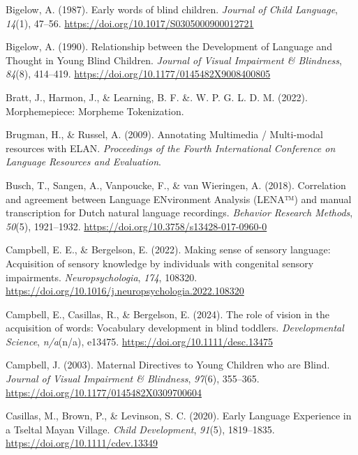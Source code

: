 \documentclass[
  man]{apa6}
\newlength{\cslhangindent}
\newlength{\cslentryspacingunit} %
\newenvironment{CSLReferences}[2] %
 {%
  \setlength{\parindent}{0pt}
  \ifodd #1
  \let\oldpar\par
  \def\par{\hangindent=\cslhangindent\oldpar}
  \fi
  \setlength{\parskip}{#2\cslentryspacingunit}
 }%
 {}
\begin{document}
\begin{CSLReferences}{1}{0}
\leavevmode{}%
Bigelow, A. (1987). Early words of blind children. \emph{Journal of Child Language}, \emph{14}(1), 47--56. \url{https://doi.org/10.1017/S0305000900012721}

\leavevmode{}%
Bigelow, A. (1990). Relationship between the {Development} of {Language} and {Thought} in {Young Blind Children}. \emph{Journal of Visual Impairment \& Blindness}, \emph{84}(8), 414--419. \url{https://doi.org/10.1177/0145482X9008400805}

\leavevmode{}%
Bratt, J., Harmon, J., \& Learning, B. F. \&. W. P. G. L. D. M. (2022). Morphemepiece: {Morpheme Tokenization}.

\leavevmode{}%
Brugman, H., \& Russel, A. (2009). Annotating {Multimedia} / {Multi-modal} resources with {ELAN}. \emph{Proceedings of the Fourth International Conference on Language Resources and Evaluation}.

\leavevmode{}%
Busch, T., Sangen, A., Vanpoucke, F., \& van Wieringen, A. (2018). Correlation and agreement between {Language ENvironment Analysis} ({LENA}™) and manual transcription for {Dutch} natural language recordings. \emph{Behavior Research Methods}, \emph{50}(5), 1921--1932. \url{https://doi.org/10.3758/s13428-017-0960-0}

\leavevmode{}%
Campbell, E. E., \& Bergelson, E. (2022). Making sense of sensory language: {Acquisition} of sensory knowledge by individuals with congenital sensory impairments. \emph{Neuropsychologia}, \emph{174}, 108320. \url{https://doi.org/10.1016/j.neuropsychologia.2022.108320}

\leavevmode{}%
Campbell, E., Casillas, R., \& Bergelson, E. (2024). The role of vision in the acquisition of words: {Vocabulary} development in blind toddlers. \emph{Developmental Science}, \emph{n/a}(n/a), e13475. \url{https://doi.org/10.1111/desc.13475}

\leavevmode{}%
Campbell, J. (2003). Maternal {Directives} to {Young Children} who are {Blind}. \emph{Journal of Visual Impairment \& Blindness}, \emph{97}(6), 355--365. \url{https://doi.org/10.1177/0145482X0309700604}

\leavevmode{}%
Casillas, M., Brown, P., \& Levinson, S. C. (2020). Early {Language Experience} in a {Tseltal Mayan Village}. \emph{Child Development}, \emph{91}(5), 1819--1835. \url{https://doi.org/10.1111/cdev.13349}


\end{CSLReferences}
\end{document}
